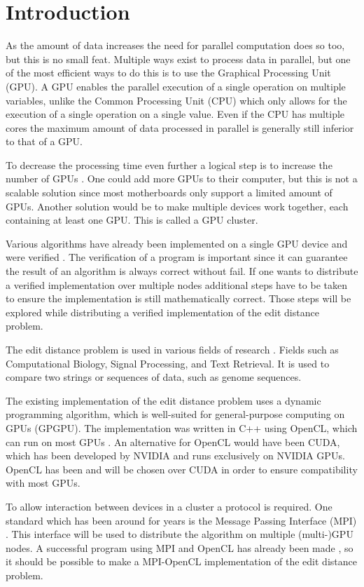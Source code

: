 \section{Introduction}
As the amount of data increases the need for parallel computation does so too, but this is no small feat.
Multiple ways exist to process data in parallel, but one of the most efficient ways to do this is to use the Graphical Processing Unit (GPU).
A GPU enables the parallel execution of a single operation on multiple variables, unlike the Common Processing Unit (CPU) which only allows for the execution of a single operation on a single value.
Even if the CPU has multiple cores the maximum amount of data processed in parallel is generally still inferior to that of a GPU.

To decrease the processing time even further a logical step is to increase the number of GPUs \cite{Cluster}.
One could add more GPUs to their computer, but this is not a scalable solution since most motherboards only support a limited amount of GPUs.
Another solution would be to make multiple devices work together, each containing at least one GPU.
This is called a GPU cluster.

Various algorithms have already been implemented on a single GPU device and were verified \cite{Heus}.
The verification of a program is important since it can guarantee the result of an algorithm is always correct without fail.
If one wants to distribute a verified implementation over multiple nodes additional steps have to be taken to ensure the implementation is still mathematically correct.
Those steps will be explored while distributing a verified implementation of the edit distance problem.

The edit distance problem is used in various fields of research \cite{Navarro:2001:GTA:375360.375365}.
Fields such as Computational Biology, Signal Processing, and Text Retrieval.
It is used to compare two strings or sequences of data, such as genome sequences.

The existing implementation of the edit distance problem uses a dynamic programming algorithm, which is well-suited for general-purpose computing on GPUs (GPGPU).
The implementation was written in C++ using OpenCL, which can run on most GPUs \cite{Kronos:conformant}.
An alternative for OpenCL would have been CUDA, which has been developed by NVIDIA and runs exclusively on NVIDIA GPUs.
OpenCL has been and will be chosen over CUDA in order to ensure compatibility with most GPUs.

To allow interaction between devices in a cluster a protocol is required.
One standard which has been around for years is the Message Passing Interface (MPI) \cite{MPI}.
This interface will be used to distribute the algorithm on multiple (multi-)GPU nodes.
A successful program using MPI and OpenCL has already been made \cite{Cluster}, so it should be possible to make a MPI-OpenCL implementation of the edit distance problem.

